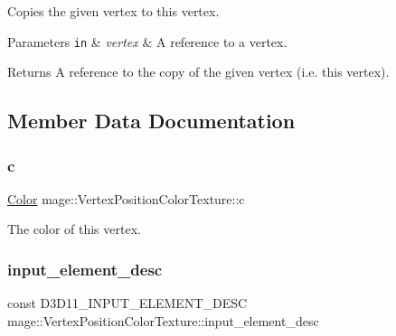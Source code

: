 Copies the given vertex to this vertex.


\begin{DoxyParams}[1]{Parameters}
\mbox{\tt in}  & {\em vertex} & A reference to a vertex. \\
\hline
\end{DoxyParams}
\begin{DoxyReturn}{Returns}
A reference to the copy of the given vertex (i.\+e. this vertex). 
\end{DoxyReturn}


\subsection{Member Data Documentation}
\hypertarget{structmage_1_1_vertex_position_color_texture_afb9ec100ec42e83e501448d4bb0ee4f8}{}\label{structmage_1_1_vertex_position_color_texture_afb9ec100ec42e83e501448d4bb0ee4f8} 
\subsubsection{\texorpdfstring{c}{c}}
{\footnotesize\ttfamily \hyperlink{structmage_1_1_color}{Color} mage\+::\+Vertex\+Position\+Color\+Texture\+::c}

The color of this vertex. \hypertarget{structmage_1_1_vertex_position_color_texture_a4be64221f4ae8e2bf37bb83fb59f2f0c}{}\label{structmage_1_1_vertex_position_color_texture_a4be64221f4ae8e2bf37bb83fb59f2f0c} 
\subsubsection{\texorpdfstring{input\+\_\+element\+\_\+desc}{input\_element\_desc}}
{\footnotesize\ttfamily const D3\+D11\+\_\+\+I\+N\+P\+U\+T\+\_\+\+E\+L\+E\+M\+E\+N\+T\+\_\+\+D\+E\+SC mage\+::\+Vertex\+Position\+Color\+Texture\+::input\+\_\+element\+\_\+desc\hspace{0.3cm}{\ttfamily [static]}}

